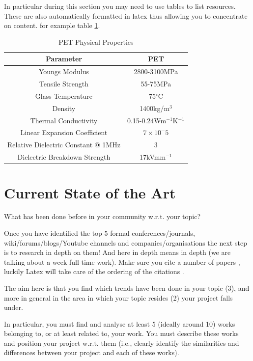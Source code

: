 In particular during this section you may need to use tables to list resources. These are also automatically formatted in latex thus allowing you to concentrate on content. for example table \ref{tab:Mylar}.

\begin{table}[ht]
	\centering
		\begin{tabular}{ c  c  }
		\hline
		\hline
		Parameter & PET \\
		\hline
		Youngs Modulus & 2800-3100MPa \\
		Tensile Strength & 55-75MPa \\
		Glass Temperature & 75$^\circ$C \\
		Density & 1400kg/m$^3$ \\
		Thermal Conductivity & 0.15-0.24Wm$^{-1}$K$^{-1}$ \\
		Linear Expansion Coefficient & $7\times10^-5$ \\
		Relative Dielectric Constant @ 1MHz & 3\\
		Dielectric Breakdown Strength & 17kVmm$^{-1}$\\
		\end{tabular}
	\caption{PET Physical Properties}
	\label{tab:Mylar}
\end{table}

\section{Current State of the Art}
What has been done before in your community w.r.t. your topic?

Once you have identified the top 5 formal conferences/journals, wiki/forums/blogs/Youtube channels and companies/organisations the next step is to research in depth on them! And here in depth means in depth (we are talking about a week full-time work). Make sure you cite\cite{Reference1} a number of papers \cite{Reference3}, luckily Latex will take care of the ordering of the citations \cite{Reference2}.

The aim here is that you find which trends have been done in your topic (3), and more in general in the area in which your topic resides (2) your project falls under. 

In particular, you must find and analyse at least 5 (ideally around 10) works belonging to, or at least related to, your work. You must describe these works and position your project w.r.t. them (i.e., clearly identify the similarities and differences between your project and each of these works).